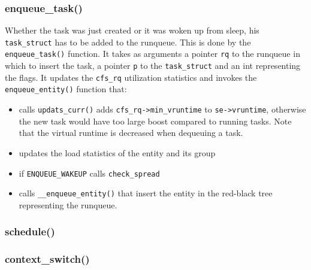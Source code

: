 \subsubsection{enqueue\_task()}
Whether the task was just created or it was woken up from sleep, his \verb|task_struct| has to be added to the runqueue. This is done by the \verb|enqueue_task()| function. It takes as arguments a pointer \verb|rq| to the runqueue in which to insert the task, a pointer \verb|p| to the \verb|task_struct| and an int representing the flags. It updates the \verb|cfs_rq| utilization statistics and invokes the \verb|enqueue_entity()| function that:
\begin{itemize}
    \item calls \verb|updats_curr()| adds \verb|cfs_rq->min_vruntime| to \verb|se->vruntime|, otherwise the new task would have too large boost compared to running tasks. Note that the virtual runtime is decreased when dequeuing a task.
    \item updates the load statistics of the entity and its group
    \item if \verb|ENQUEUE_WAKEUP| calls \verb|check_spread|
    \item calls \verb|__enqueue_entity()| that insert the entity in the red-black tree representing the runqueue.
\end{itemize}

\subsubsection{schedule()}

\subsubsection{context\_switch()}
